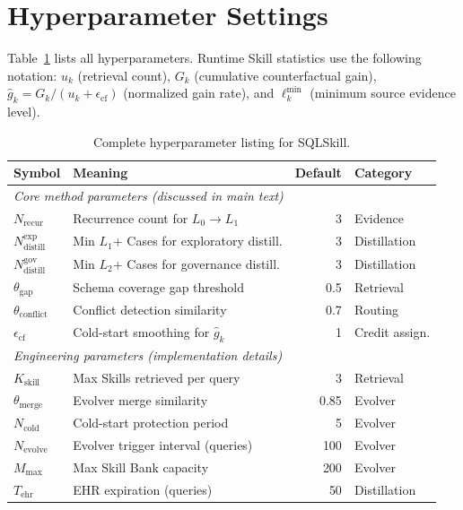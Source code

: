 
\section{Hyperparameter Settings}
\label{sec:hyperparams}

Table~\ref{tab:hyperparams} lists all hyperparameters. Runtime Skill statistics use the following notation: $u_k$ (retrieval count), $G_k$ (cumulative counterfactual gain), $\hat{g}_k = G_k/(u_k + \epsilon_{\text{cf}})$ (normalized gain rate), and $\ell_k^{\min}$ (minimum source evidence level).

\begin{table}[h]
  \centering
  \small
  \caption{Complete hyperparameter listing for SQLSkill.}
  \label{tab:hyperparams}
  \begin{tabular}{llrl}
    \toprule
    \textbf{Symbol} & \textbf{Meaning} & \textbf{Default} & \textbf{Category} \\
    \midrule
    \multicolumn{4}{l}{\emph{Core method parameters (discussed in main text)}} \\
    $N_{\text{recur}}$ & Recurrence count for $L_0 {\to} L_1$ & 3 & Evidence \\
    $N_{\text{distill}}^{\text{exp}}$ & Min $L_1$+ Cases for exploratory distill. & 3 & Distillation \\
    $N_{\text{distill}}^{\text{gov}}$ & Min $L_2$+ Cases for governance distill. & 3 & Distillation \\
    $\theta_{\text{gap}}$ & Schema coverage gap threshold & 0.5 & Retrieval \\
    $\theta_{\text{conflict}}$ & Conflict detection similarity & 0.7 & Routing \\
    $\epsilon_{\text{cf}}$ & Cold-start smoothing for $\hat{g}_k$ & 1 & Credit assign. \\
    \midrule
    \multicolumn{4}{l}{\emph{Engineering parameters (implementation details)}} \\
    $K_{\text{skill}}$ & Max Skills retrieved per query & 3 & Retrieval \\
    $\theta_{\text{merge}}$ & Evolver merge similarity & 0.85 & Evolver \\
    $N_{\text{cold}}$ & Cold-start protection period & 5 & Evolver \\
    $N_{\text{evolve}}$ & Evolver trigger interval (queries) & 100 & Evolver \\
    $M_{\text{max}}$ & Max Skill Bank capacity & 200 & Evolver \\
    $T_{\text{ehr}}$ & EHR expiration (queries) & 50 & Distillation \\
    \bottomrule
  \end{tabular}
\end{table}

